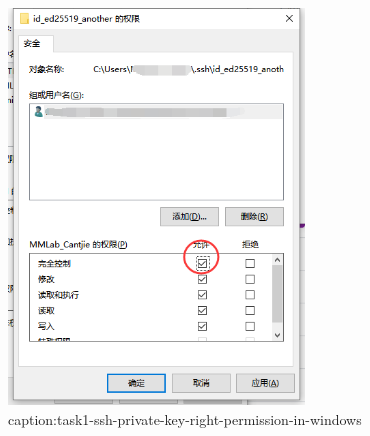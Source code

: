 \begin{figure}[htbp]
	\centering
	\includegraphics[width=0.7\textwidth]{figures/task1-ssh-private-key-right-permission-in-windows.png}
	\caption{caption:task1-ssh-private-key-right-permission-in-windows}
	\label{fig:task1-ssh-private-key-right-permission-in-windows}
\end{figure}